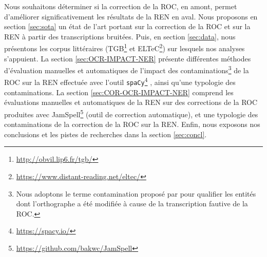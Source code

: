 Nous souhaitons déterminer si la correction de la ROC, en amont, permet d’améliorer  significativement les résultats de la REN en aval. Nous proposons en section \ref{sec:sota} un état de l'art portant sur la correction de la ROC et sur la REN à partir des transcriptions bruitées. Puis, en section \ref{sec:data}, nous présentons les corpus littéraires (TGB\footnote{\url{http://obvil.lip6.fr/tgb/}} et ELTeC\footnote{\url{https://www.distant-reading.net/eltec/}}) sur lesquels nos analyses s'appuient. La section \ref{sec:OCR-IMPACT-NER} présente différentes méthodes d'évaluation manuelles et automatiques de l'impact des contaminations\footnote{Nous adoptons le terme \og{}contamination\fg{} proposé par \cite{hamdi:hal-03615997} pour qualifier les entités dont l'orthographe a été modifiée à cause de la transcription fautive de la ROC.} de la ROC sur la REN effectuée avec l'outil \texttt{spaCy}\footnote{\url{https://spacy.io/}} \cite{ines_montani_2023_7715077}, ainsi qu'une typologie des contaminations. La section \ref{sec:COR-OCR-IMPACT-NER} comprend les évaluations manuelles et automatiques de la REN sur des corrections de la ROC produites avec JamSpell\footnote{\url{https://github.com/bakwc/JamSpell}} (outil de correction automatique), et une typologie des contaminations de la correction de la ROC sur la REN. 
Enfin, nous exposons nos conclusions et les pistes de recherches dans la section \ref{sec:concl}.
